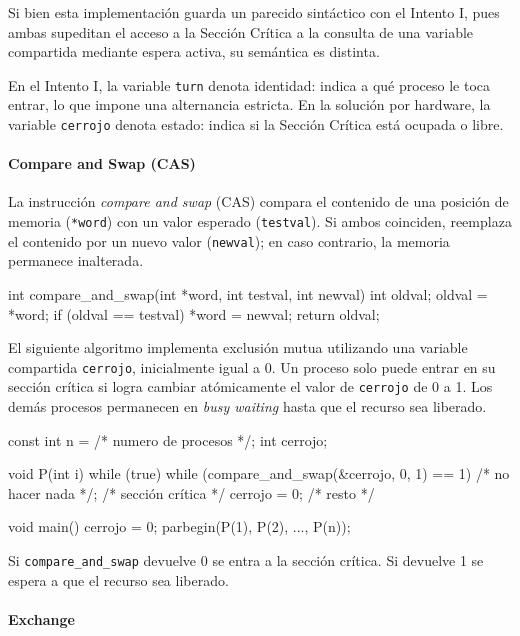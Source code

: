 Si bien esta implementación guarda un parecido sintáctico con el Intento I, pues ambas supeditan el acceso a la Sección Crítica a la consulta de una variable compartida mediante espera activa, su semántica es distinta.

En el Intento I, la variable \texttt{turn} denota identidad: indica a qué proceso le toca entrar, lo que impone una alternancia estricta. En la solución por hardware, la variable \texttt{cerrojo} denota estado: indica si la Sección Crítica está ocupada o libre.

\paragraph{Compare and Swap (CAS)}

La instrucción \textit{compare and swap} (CAS) compara el contenido de una posición de memoria (\texttt{*word}) con un valor esperado (\texttt{testval}). Si ambos coinciden, reemplaza el contenido por un nuevo valor (\texttt{newval}); en caso contrario, la memoria permanece inalterada.

\begin{ccode}[title=Ejemplo de firma de la instrucción CAS]
int compare_and_swap(int *word, int testval, int newval) {
  int oldval;
  oldval = *word;
  if (oldval == testval)
      *word = newval;
  return oldval;
}
\end{ccode}

El siguiente algoritmo implementa exclusión mutua utilizando una variable compartida \texttt{cerrojo}, inicialmente igual a 0. Un proceso solo puede entrar en su sección crítica si logra cambiar atómicamente el valor de \texttt{cerrojo} de 0 a 1. Los demás procesos permanecen en \textit{busy waiting} hasta que el recurso sea liberado.

\begin{ccode}[title=Exclusión mutua usando CAS]
const int n = /* numero de procesos */;
int cerrojo;

void P(int i) {
  while (true) {
    while (compare_and_swap(&cerrojo, 0, 1) == 1){
      /* no hacer nada */;
    }
    /* sección crítica */
    cerrojo = 0;
    /* resto */
  }
}

void main() {
  cerrojo = 0;
  parbegin(P(1), P(2), ..., P(n));
}
\end{ccode}

Si \texttt{compare\_and\_swap} devuelve 0 se entra a la sección crítica. Si devuelve 1 se espera a que el recurso sea liberado.

\paragraph{Exchange}


